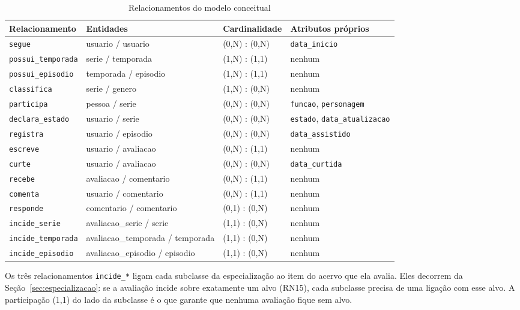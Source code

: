 \documentclass[a4paper,12pt,oneside,openany]{book}
\newcommand{\id}[1]{\texttt{#1}}
\begin{document}
\begin{table}[H]
\centering
\caption{Relacionamentos do modelo conceitual}
\label{tab:relacionamentos}
\small
\begin{tabularx}{\textwidth}{@{}lllX@{}}
\toprule
\textbf{Relacionamento} & \textbf{Entidades} & \textbf{Cardinalidade} & \textbf{Atributos próprios} \\
\midrule
\id{segue} & usuario / usuario & (0,N) : (0,N) & \id{data\_inicio} \\
\id{possui\_temporada} & serie / temporada & (1,N) : (1,1) & nenhum \\
\id{possui\_episodio} & temporada / episodio & (1,N) : (1,1) & nenhum \\
\id{classifica} & serie / genero & (1,N) : (0,N) & nenhum \\
\id{participa} & pessoa / serie & (0,N) : (0,N) & \id{funcao}, \id{personagem} \\
\id{declara\_estado} & usuario / serie & (0,N) : (0,N) & \id{estado}, \id{data\_atualizacao} \\
\id{registra} & usuario / episodio & (0,N) : (0,N) & \id{data\_assistido} \\
\id{escreve} & usuario / avaliacao & (0,N) : (1,1) & nenhum \\
\id{curte} & usuario / avaliacao & (0,N) : (0,N) & \id{data\_curtida} \\
\id{recebe} & avaliacao / comentario & (0,N) : (1,1) & nenhum \\
\id{comenta} & usuario / comentario & (0,N) : (1,1) & nenhum \\
\id{responde} & comentario / comentario & (0,1) : (0,N) & nenhum \\
\id{incide\_serie} & avaliacao\_serie / serie & (1,1) : (0,N) & nenhum \\
\id{incide\_temporada} & avaliacao\_temporada / temporada & (1,1) : (0,N) & nenhum \\
\id{incide\_episodio} & avaliacao\_episodio / episodio & (1,1) : (0,N) & nenhum \\
\bottomrule
\end{tabularx}
\end{table}

Os três relacionamentos \id{incide\_*} ligam cada subclasse da especialização ao item do acervo que ela avalia. Eles decorrem da Seção~\ref{sec:especializacao}: se a avaliação incide sobre exatamente um alvo (RN15), cada subclasse precisa de uma ligação com esse alvo. A participação (1,1) do lado da subclasse é o que garante que nenhuma avaliação fique sem alvo.
\end{document}
